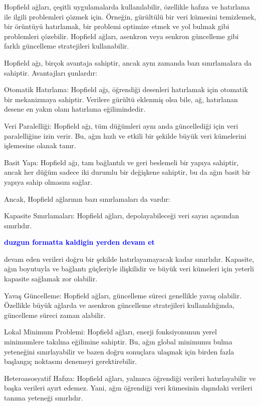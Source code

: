 \documentclass[11pt]{article}
\begin{document}
Hopfield ağları, çeşitli uygulamalarda kullanılabilir, özellikle hafıza ve hatırlama ile ilgili problemleri çözmek için. Örneğin, gürültülü bir veri kümesini temizlemek, bir örüntüyü hatırlamak, bir problemi optimize etmek ve yol bulmak gibi problemleri çözebilir. Hopfield ağları, asenkron veya senkron güncelleme gibi farklı güncelleme stratejileri kullanabilir.

Hopfield ağı, birçok avantaja sahiptir, ancak aynı zamanda bazı sınırlamalara da sahiptir. Avantajları şunlardır:

Otomatik Hatırlama: Hopfield ağı, öğrendiği desenleri hatırlamak için otomatik bir mekanizmaya sahiptir. Verilere gürültü eklenmiş olsa bile, ağ, hatırlanan desene en yakın olanı hatırlama eğilimindedir.

Veri Paralelliği: Hopfield ağı, tüm düğümleri aynı anda güncellediği için veri paralelliğine izin verir. Bu, ağın hızlı ve etkili bir şekilde büyük veri kümelerini işlemesine olanak tanır.

Basit Yapı: Hopfield ağı, tam bağlantılı ve geri beslemeli bir yapıya sahiptir, ancak her düğüm sadece iki durumlu bir değişkene sahiptir, bu da ağın basit bir yapıya sahip olmasını sağlar.

Ancak, Hopfield ağlarının bazı sınırlamaları da vardır:

Kapasite Sınırlamaları: Hopfield ağları, depolayabileceği veri sayısı açısından sınırlıdır.

\textbf{\textcolor{blue}{duzgun formatta kaldigin yerden devam et}}

devam eden verileri doğru bir şekilde hatırlayamayacak kadar sınırlıdır. Kapasite, ağın boyutuyla ve bağlantı güçleriyle ilişkilidir ve büyük veri kümeleri için yeterli kapasite sağlamak zor olabilir.

Yavaş Güncelleme: Hopfield ağları, güncelleme süreci genellikle yavaş olabilir. Özellikle büyük ağlarda ve asenkron güncelleme stratejileri kullanıldığında, güncelleme süreci zaman alabilir.

Lokal Minimum Problemi: Hopfield ağları, enerji fonksiyonunun yerel minimumlere takılma eğilimine sahiptir. Bu, ağın global minimumu bulma yeteneğini sınırlayabilir ve bazen doğru sonuçlara ulaşmak için birden fazla başlangıç ​​noktasını denemeyi gerektirebilir.

Heteroasosyatif Hafıza: Hopfield ağları, yalnızca öğrendiği verileri hatırlayabilir ve başka verileri ayırt edemez. Yani, ağın öğrendiği veri kümesinin dışındaki verileri tanıma yeteneği sınırlıdır.
\end{document}
